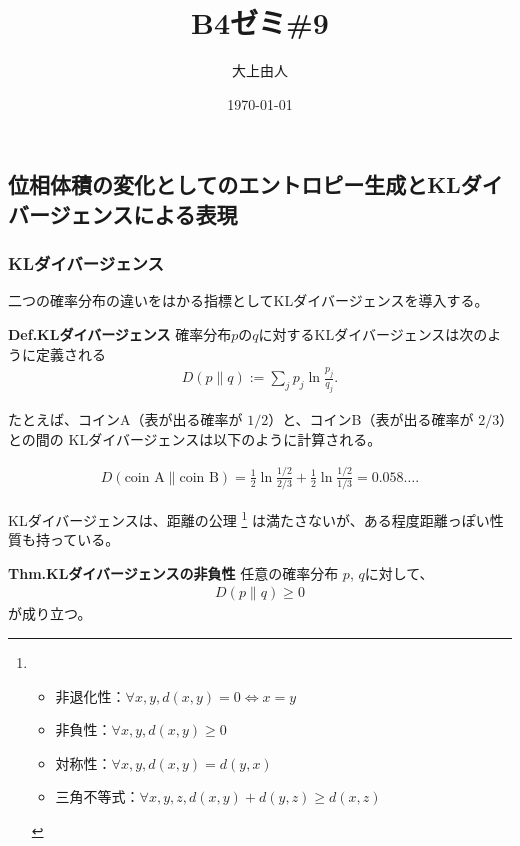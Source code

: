 \documentclass[a4paper,11pt]{jsarticle}
\numberwithin{equation}{section}
\begin{document}
\title{B4ゼミ\#9}
\author{大上由人}
\date{\today}
\maketitle

\setcounter{section}{5}
\setcounter{subsection}{2}
\subsection{位相体積の変化としてのエントロピー生成とKLダイバージェンスによる表現}
\subsubsection{KLダイバージェンス}
二つの確率分布の違いをはかる指標としてKLダイバージェンスを導入する。

\begin{itembox}[l]{\textbf{Def.KLダイバージェンス}}
    確率分布$p$の$q$に対するKLダイバージェンスは次のように定義される
\begin{align}
    D(p \| q) := \sum_j p_j \ln \frac{p_j}{q_j}.
\end{align}
\end{itembox}

たとえば、コインA（表が出る確率が $1/2$）と、コインB（表が出る確率が $2/3$）との間の
KLダイバージェンスは以下のように計算される。

\begin{align}
D(\text{coin A} \| \text{coin B}) 
= \frac{1}{2} \ln \frac{1/2}{2/3} + \frac{1}{2} \ln \frac{1/2}{1/3}
= 0.058 \dots. 
\end{align}

KLダイバージェンスは、距離の公理
\footnote{
    \begin{itemize}
        \item 非退化性：$\forall x, y, d(x, y) = 0 \Leftrightarrow x = y$
        \item 非負性：$\forall x, y, d(x, y) \geq 0$
        \item 対称性：$\forall x, y, d(x, y) = d(y, x)$
        \item 三角不等式：$\forall x, y, z, d(x, y) + d(y, z) \geq d(x, z)$
    \end{itemize}
        
}
は満たさないが、ある程度距離っぽい性質も持っている。
\begin{itembox}[l]{\textbf{Thm.KLダイバージェンスの非負性}}
    任意の確率分布 $p$, $q$に対して、
    \begin{align}
D(p \| q) \geq 0 
\end{align}
    が成り立つ。
\end{itembox}
\end{document}
